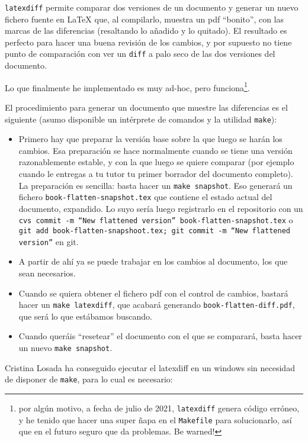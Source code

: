 \texttt{latexdiff} permite comparar dos versiones de un documento y
generar un nuevo fichero fuente en \LaTeX{} que, al compilarlo, muestra un
pdf  ``bonito'', con las marcas de las diferencias (resaltando lo añadido
y lo quitado). El resultado es perfecto para hacer una buena revisión de
los cambios, y por supuesto no tiene punto de comparación con ver un
\texttt{diff} a palo seco de las dos versiones del documento. 

Lo que finalmente he implementado es muy ad-hoc, pero
funciona\footnote{por algún motivo, a fecha de julio de 2021,
  \texttt{latexdiff} genera código erróneo, y he tenido que hacer una
  super ñapa en el \texttt{Makefile} para solucionarlo, así que en el
  futuro seguro que da problemas. Be warned!}.

El procedimiento para generar un documento que muestre las
diferencias es el siguiente (asumo disponible un intérprete de
comandos y la utilidad \texttt{make}):

\begin{itemize}
\item Primero hay que preparar la versión base sobre la que luego se
  harán los cambios. Esa preparación se hace normalmente cuando se
  tiene una versión razonablemente estable, y con la que luego se
  quiere comparar (por ejemplo cuando le entregas a tu tutor tu primer
  borrador del documento completo). La preparación es sencilla: basta
  hacer un \texttt{make snapshot}. Eso generará un fichero
  \texttt{book-flatten-snapshot.tex} que contiene el estado actual del
  documento, expandido. Lo suyo sería luego registrarlo en el
  repositorio con un \texttt{cvs commit -m ``New flattened version''
    book-flatten-snapshot.tex} o \texttt{git add
    book-flatten-snapshoot.tex; git commit -m ``New flattened
    version''} en git.
\item A partir de ahí ya se puede trabajar en los cambios al documento,
  los que sean necesarios.
\item Cuando se quiera obtener el fichero pdf con el control de cambios,
  bastará hacer un \texttt{make latexdiff}, que acabará generando
  \texttt{book-flatten-diff.pdf}, que será lo que estábamos buscando.
  
\item Cuando queráis ``resetear'' el documento con el que se comparará,
  basta hacer un nuevo \texttt{make snapshot}.
\end{itemize}

Cristina Losada ha conseguido ejecutar el latexdiff en un windows sin
necesidad de disponer de \texttt{make}, para lo cual es necesario:

